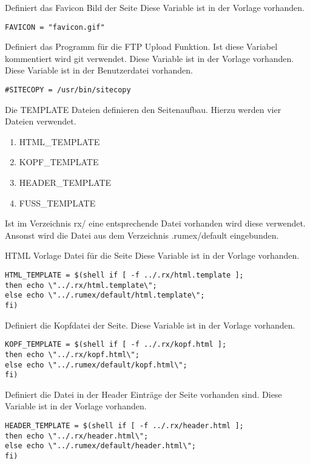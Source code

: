 {Definiert das Favicon Bild der Seite}
{Diese Variable ist in der Vorlage vorhanden.}
{}
{\scriptsize
\begin{Verbatim}
FAVICON = "favicon.gif"
\end{Verbatim}
}


{Definiert das Programm für die FTP Upload Funktion.
Ist diese Variabel kommentiert wird git verwendet.}
{Diese Variable ist in der Vorlage vorhanden.}
{Diese Variable ist in der Benutzerdatei vorhanden.}
{\scriptsize
\begin{Verbatim}
#SITECOPY = /usr/bin/sitecopy
\end{Verbatim}
}


Die TEMPLATE Dateien definieren den Seitenaufbau.
Hierzu werden vier Dateien verwendet.

\begin{enumerate}
\item HTML\_TEMPLATE
\item KOPF\_TEMPLATE
\item HEADER\_TEMPLATE
\item FUSS\_TEMPLATE
\end{enumerate}

Ist im Verzeichnis rx/ eine entsprechende Datei vorhanden wird
diese verwendet.
Ansonst wird die Datei aus dem Verzeichnis .rumex/default eingebunden.

{HTML Vorlage Datei für die Seite}
{Diese Variable ist in der Vorlage vorhanden.}
{}
{\scriptsize
\begin{Verbatim}
HTML_TEMPLATE = $(shell if [ -f ../.rx/html.template ];
then echo \"../.rx/html.template\";
else echo \"../.rumex/default/html.template\";
fi)
\end{Verbatim}
}



{Definiert die Kopfdatei der Seite.}
{Diese Variable ist in der Vorlage vorhanden.}
{}
{\scriptsize
\begin{Verbatim}
KOPF_TEMPLATE = $(shell if [ -f ../.rx/kopf.html ];
then echo \"../.rx/kopf.html\";
else echo \"../.rumex/default/kopf.html\";
fi)
\end{Verbatim}
}



{Definiert die Datei in der Header Einträge der Seite vorhanden sind.}
{Diese Variable ist in der Vorlage vorhanden.}
{}
{\scriptsize
\begin{Verbatim}
HEADER_TEMPLATE = $(shell if [ -f ../.rx/header.html ];
then echo \"../.rx/header.html\";
else echo \"../.rumex/default/header.html\";
fi)
\end{Verbatim}
}




